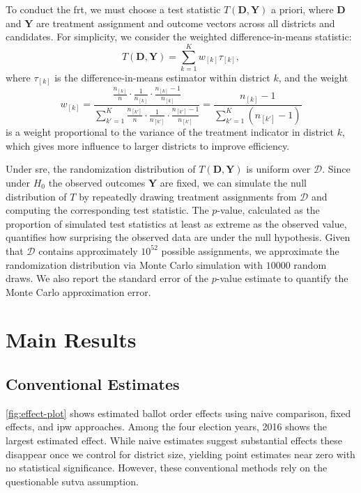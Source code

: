 \documentclass[10pt]{article}
\theoremstyle{sfstyle}
\theoremstyle{remark}
\begin{document}
To conduct the \gls{frt},
we must choose a test statistic
$T(\mathbf{D}, \mathbf{Y})$ a priori,
where $\mathbf{D}$ and $\mathbf{Y}$
are treatment assignment and outcome vectors
across all districts and candidates.
For simplicity,
we consider the weighted difference-in-means statistic:
\[
  T(\mathbf{D}, \mathbf{Y}) =
  \sum_{k=1}^K w_{[k]} \tau_{[k]},
\]
where $\tau_{[k]}$ is the difference-in-means estimator
within district $k$,
and the weight
\[
  w_{[k]} 
  = \frac{\frac{n_{[k]}}{n} \cdot \frac{1}{n_{[k]}} \cdot \frac{n_{[k]} - 1}{n_{[k]}}}{\sum_{k'=1}^K \frac{n_{[k']}}{n} \cdot \frac{1}{n_{[k']}} \cdot \frac{n_{[k']} - 1}{n_{[k']}}}
  = \frac{n_{[k]} - 1}{\sum_{k'=1}^K (n_{[k']} - 1)}
\]
is a weight proportional to the variance of the treatment indicator
in district $k$,
which gives more influence to larger districts
to improve efficiency.

Under \gls{sre},
the randomization distribution of $T(\mathbf{D}, \mathbf{Y})$
is uniform over $\mathcal{D}$.
Since under $H_0$ the observed outcomes $\mathbf{Y}$ are fixed,
we can simulate the null distribution of $T$
by repeatedly drawing treatment assignments from $\mathcal{D}$
and computing the corresponding test statistic.
The $p$-value,
calculated as the proportion of simulated test statistics
at least as extreme as the observed value,
quantifies how surprising the observed data are under the null hypothesis.
Given that $\mathcal{D}$ contains approximately $10^{52}$ possible assignments,
we approximate the randomization distribution via Monte Carlo simulation
with $10000$ random draws.
We also report the standard error of the $p$-value estimate
to quantify the Monte Carlo approximation error.

\section{Main Results} \label{sec:main-results}

\subsection{Conventional Estimates}

\cref{fig:effect-plot} shows 
estimated ballot order effects using 
naive comparison, fixed effects, 
and \gls{ipw} approaches. 
Among the four election years,
2016 shows the largest estimated effect.
While naive estimates suggest substantial effects 
these disappear once we control for district size, 
yielding point estimates near zero with 
no statistical significance. 
However, these conventional methods 
rely on the questionable \gls{sutva} assumption.
\end{document}
